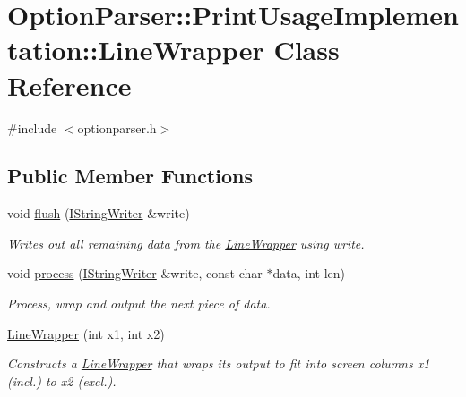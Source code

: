 \hypertarget{class_option_parser_1_1_print_usage_implementation_1_1_line_wrapper}{\section{Option\-Parser\-:\-:Print\-Usage\-Implementation\-:\-:Line\-Wrapper Class Reference}
\label{class_option_parser_1_1_print_usage_implementation_1_1_line_wrapper}
}


{\ttfamily \#include $<$optionparser.\-h$>$}

\subsection*{Public Member Functions}
\begin{DoxyCompactItemize}
\item 
void \hyperlink{class_option_parser_1_1_print_usage_implementation_1_1_line_wrapper_ac305d66cf29832f626dcb30046b09dca}{flush} (\hyperlink{struct_option_parser_1_1_print_usage_implementation_1_1_i_string_writer}{I\-String\-Writer} \&write)
\begin{DoxyCompactList}\small\item\em Writes out all remaining data from the \hyperlink{class_option_parser_1_1_print_usage_implementation_1_1_line_wrapper}{Line\-Wrapper} using {\ttfamily write}. \end{DoxyCompactList}\item 
void \hyperlink{class_option_parser_1_1_print_usage_implementation_1_1_line_wrapper_adf252f2ddcbaafa69352e86e364c7c72}{process} (\hyperlink{struct_option_parser_1_1_print_usage_implementation_1_1_i_string_writer}{I\-String\-Writer} \&write, const char $\ast$data, int len)
\begin{DoxyCompactList}\small\item\em Process, wrap and output the next piece of data. \end{DoxyCompactList}\item 
\hyperlink{class_option_parser_1_1_print_usage_implementation_1_1_line_wrapper_a71490aa987b10240926ced81f4f95a9b}{Line\-Wrapper} (int x1, int x2)
\begin{DoxyCompactList}\small\item\em Constructs a \hyperlink{class_option_parser_1_1_print_usage_implementation_1_1_line_wrapper}{Line\-Wrapper} that wraps its output to fit into screen columns {\ttfamily x1} (incl.) to {\ttfamily x2} (excl.). \end{DoxyCompactList}\end{DoxyCompactItemize}


